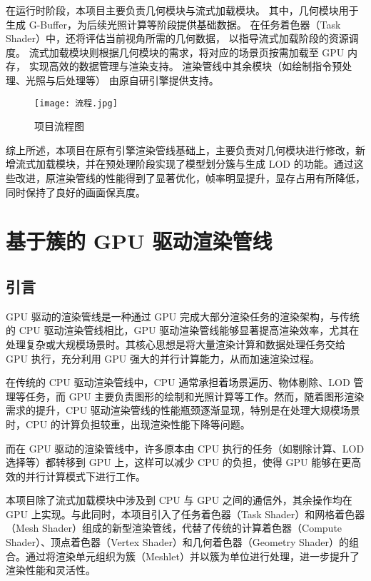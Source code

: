 \par 在运行时阶段，本项目主要负责几何模块与流式加载模块。  
其中，几何模块用于生成 G-Buffer，为后续光照计算等阶段提供基础数据。  
在任务着色器（Task Shader）中，还将评估当前视角所需的几何数据，  
以指导流式加载阶段的资源调度。  
流式加载模块则根据几何模块的需求，将对应的场景页按需加载至 GPU 内存，  
实现高效的数据管理与渲染支持。  
渲染管线中其余模块（如绘制指令预处理、光照与后处理等）  
由原自研引擎提供支持。

\begin{figure}[ht]
    \centering
    \texttt{[image: 流程.jpg]}
    \caption{\label{fig:流程}项目流程图}
\end{figure}

\par 综上所述，本项目在原有引擎渲染管线基础上，主要负责对几何模块进行修改，新增流式加载模块，并在预处理阶段实现了模型划分簇与生成 LOD 的功能。通过这些改进，原渲染管线的性能得到了显著优化，帧率明显提升，显存占用有所降低，同时保持了良好的画面保真度。

\section{基于簇的 GPU 驱动渲染管线}

\subsection{引言}

GPU 驱动的渲染管线是一种通过 GPU 完成大部分渲染任务的渲染架构，与传统的 CPU 驱动渲染管线相比，GPU 驱动渲染管线能够显著提高渲染效率，尤其在处理复杂或大规模场景时。其核心思想是将大量渲染计算和数据处理任务交给 GPU 执行，充分利用 GPU 强大的并行计算能力，从而加速渲染过程。

在传统的 CPU 驱动渲染管线中，CPU 通常承担着场景遍历、物体剔除、LOD 管理等任务，而 GPU 主要负责图形的绘制和光照计算等工作。然而，随着图形渲染需求的提升，CPU 驱动渲染管线的性能瓶颈逐渐显现，特别是在处理大规模场景时，CPU 的计算负担较重，出现渲染性能下降等问题。

而在 GPU 驱动的渲染管线中，许多原本由 CPU 执行的任务（如剔除计算、LOD 选择等）都转移到 GPU 上，这样可以减少 CPU 的负担，使得 GPU 能够在更高效的并行计算模式下进行工作。

本项目除了流式加载模块中涉及到 CPU 与 GPU 之间的通信外，其余操作均在 GPU 上实现。与此同时，本项目引入了任务着色器（Task Shader）和网格着色器（Mesh Shader）组成的新型渲染管线，代替了传统的计算着色器（Compute Shader）、顶点着色器（Vertex Shader）和几何着色器（Geometry Shader）的组合。通过将渲染单元组织为簇（Meshlet）并以簇为单位进行处理，进一步提升了渲染性能和灵活性。

